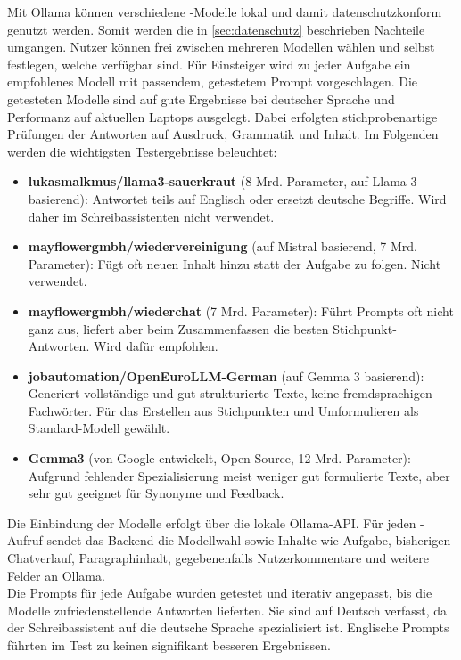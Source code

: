 \documentclass[../main.tex]{subfiles}
\begin{document}
Mit Ollama können verschiedene -Modelle lokal und damit datenschutzkonform genutzt werden. Somit werden die in \autoref{sec:datenschutz} beschrieben Nachteile umgangen. 
Nutzer können frei zwischen mehreren Modellen wählen und selbst festlegen, welche verfügbar sind. Für Einsteiger wird zu jeder Aufgabe ein empfohlenes Modell mit passendem, 
getestetem Prompt vorgeschlagen. Die getesteten Modelle sind auf gute Ergebnisse bei deutscher Sprache und Performanz auf aktuellen Laptops ausgelegt. Dabei erfolgten stichprobenartige 
Prüfungen der Antworten auf Ausdruck, Grammatik und Inhalt. Im Folgenden werden die wichtigsten Testergebnisse beleuchtet:

\begin{itemize} \item \textbf{lukasmalkmus/llama3-sauerkraut} (8 Mrd. Parameter, auf Llama-3 basierend)\cite{sauerkraut}: Antwortet teils auf Englisch oder ersetzt deutsche Begriffe. Wird daher im Schreibassistenten nicht verwendet.


\item \textbf{mayflowergmbh/wiedervereinigung} (auf Mistral basierend, 7 Mrd. Parameter)\cite{wiedervereinigung}: Fügt oft neuen Inhalt hinzu statt der Aufgabe zu folgen. Nicht verwendet.

\item \textbf{mayflowergmbh/wiederchat} (7 Mrd. Parameter)\cite{wiederchat}: Führt Prompts oft nicht ganz aus, liefert aber beim Zusammenfassen die besten Stichpunkt-Antworten. Wird dafür empfohlen.

\item \textbf{jobautomation/OpenEuroLLM-German} (auf Gemma 3 basierend)\cite{openeurollm}: Generiert vollständige und gut strukturierte Texte, keine fremdsprachigen Fachwörter. Für das Erstellen aus Stichpunkten und Umformulieren als Standard-Modell gewählt.

\item \textbf{Gemma3} (von Google entwickelt, Open Source, 12 Mrd. Parameter)\cite{gemma3}: Aufgrund fehlender Spezialisierung meist weniger gut formulierte Texte, aber sehr gut geeignet für Synonyme und Feedback. \end{itemize}

Die Einbindung der Modelle erfolgt über die lokale Ollama-API. Für jeden -Aufruf sendet das Backend die Modellwahl sowie Inhalte wie Aufgabe, bisherigen Chatverlauf, 
Paragraphinhalt, gegebenenfalls Nutzerkommentare und weitere Felder an Ollama.\\ Die Prompts für jede Aufgabe wurden getestet und iterativ angepasst, bis die Modelle zufriedenstellende Antworten 
lieferten. Sie sind auf Deutsch verfasst, da der Schreibassistent auf die deutsche Sprache spezialisiert ist. Englische Prompts führten im Test zu keinen signifikant besseren Ergebnissen.
\end{document}

